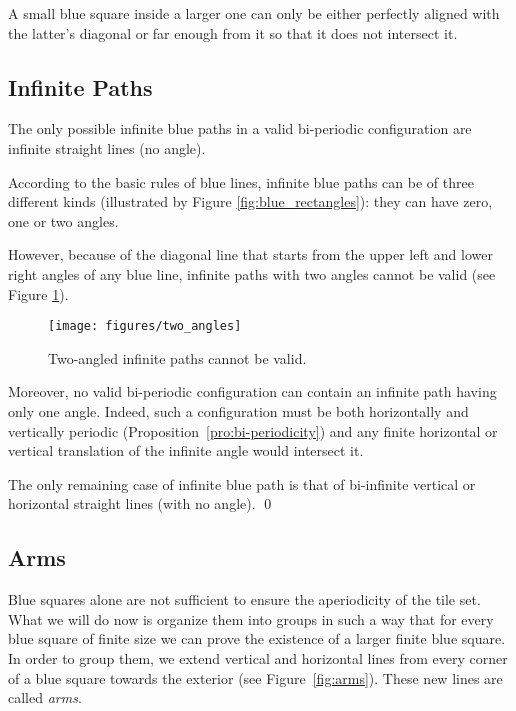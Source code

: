 \documentclass{jac}
\begin{document}
\remark A small blue square inside a larger one can only be either perfectly aligned with the latter's diagonal or far enough from it so that it does not intersect it.

\subsection{Infinite Paths} \label{sub:infinite_paths}

\begin{lemma}\label{lem:infinite}
    The only possible infinite blue paths in a valid bi-periodic configuration are infinite straight lines (no angle).
\end{lemma}
\proof
According to the basic rules of blue lines, infinite blue paths can be of three different kinds (illustrated by Figure \ref{fig:blue_rectangles}): they can have zero, one or two angles.

However, because of the diagonal line that starts from the upper left and lower right angles of any blue line, infinite paths with two angles cannot be valid (see Figure \ref{fig:two_angles}).

\begin{figure}[htbp]
	\texttt{[image: figures/two\_angles]}
    \caption{Two-angled infinite paths cannot be valid.}
    \label{fig:two_angles}
\end{figure}

Moreover, no valid bi-periodic configuration can contain an infinite path having only one angle. Indeed, such a configuration must be both horizontally and vertically periodic (Proposition~\ref{pro:bi-periodicity}) and any finite horizontal or vertical translation of the infinite angle would intersect it. 

The only remaining case of infinite blue path is that of bi-infinite vertical or horizontal straight lines (with no angle).
\qed

\subsection{Arms} \label{sub:arms}

Blue squares alone are not sufficient to ensure the aperiodicity of the tile set. What we will do now is organize them into groups in such a way that for every blue square of finite size we can prove the existence of a larger finite blue square. In order to group them, we extend vertical and horizontal lines from every corner of a blue square towards the exterior (see Figure~\ref{fig:arms}). These new lines are called \emph{arms}.
\end{document}
